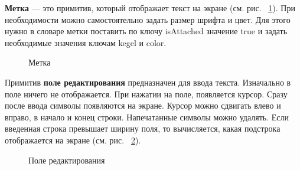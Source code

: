 \documentclass[14pt]{extarticle}
\begin{document}
		\textbf{Метка} --- это примитив, который отображает текст на экране (см. рис. ~\ref{labelField}). При необходимости можно самостоятельно задать размер шрифта и цвет. Для этого нужно в словаре метки поставить по ключу isAttached значение true и задать необходимые значения ключам kegel и color. 
		\begin{figure}[h]
		\caption{ Метка }
		\label{labelField}
		\end{figure}	

		Примитив \textbf{поле редактирования} предназначен для ввода текста. Изначально в поле ничего не отображается. При нажатии на поле, появляется курсор. Сразу после ввода символы появляются на экране. Курсор можно сдвигать влево и вправо, в начало и конец строки. Напечатанные символы можно удалять. Если введенная строка превышает ширину поля, то вычисляется, какая подстрока отображается на экране (см. рис. ~\ref{textField}).
		\begin{figure}[h!]
		\caption{ Поле редактирования }
		\label{textField}
		\end{figure}	
		
\end{document}
